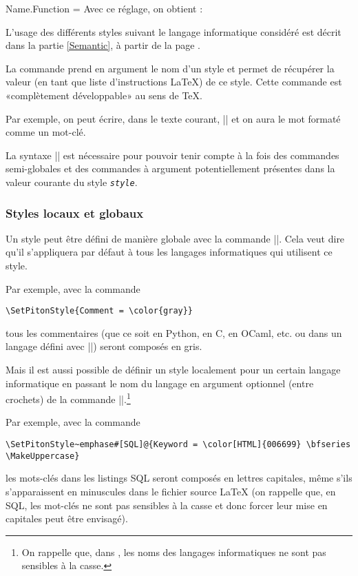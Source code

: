 \documentclass[dvipsnames,svgnames]{article}
\begin{document}
\medskip
\begingroup
\SetPitonStyle 
  { Name.Function = \bfseries \highLight[red!30] }
Avec ce réglage, on obtient : 
\endgroup

\bigskip
L'usage des différents styles suivant le langage informatique considéré est décrit dans la
partie \ref{Semantic}, à partir de la page \pageref{Semantic}.


\bigskip
{} La commande  prend en argument le
nom d'un style et permet de récupérer la valeur (en tant que liste d'instructions LaTeX)
de ce style. Cette commande est «complètement développable» au sens de TeX.

\smallskip
Par exemple, on peut écrire, dans le texte courant, |{}| et
on aura le mot {} formaté comme un mot-clé.

\smallskip
La syntaxe |{}| est nécessaire pour pouvoir
tenir compte à la fois des commandes semi-globales et des commandes à argument
potentiellement présentes dans la valeur courante du style \texttt{\textsl{style}}.


\subsubsection{Styles locaux et globaux}

Un style peut être défini de manière globale avec la commande |\SetPitonStyle|. Cela veut
dire qu'il s'appliquera par défaut à tous les langages informatiques qui utilisent ce
style.

\medskip
Par exemple, avec la commande 
\begin{Verbatim}
\SetPitonStyle{Comment = \color{gray}}
\end{Verbatim}
tous les commentaires (que ce soit en Python, en C, en OCaml, etc. ou dans un langage
défini avec |\NewPitonLanguage|) seront composés en gris.

\bigskip
Mais il est aussi possible de définir un style localement pour un certain langage
informatique en passant le nom du langage en argument optionnel (entre crochets) de la
commande |\SetPitonStyle|.\footnote{On rappelle que, dans , les noms des
  langages informatiques ne sont pas sensibles à la casse.}

\medskip
Par exemple, avec la commande 
\begin{Verbatim}
\SetPitonStyle~emphase#[SQL]@{Keyword = \color[HTML]{006699} \bfseries \MakeUppercase}
\end{Verbatim}
les mots-clés dans les listings SQL seront composés en lettres capitales, même s'ils
s'apparaissent en minuscules dans le fichier source LaTeX (on rappelle que, en SQL, les
mot-clés ne sont pas sensibles à la casse et donc forcer leur mise en capitales peut être
envisagé).
\end{document}

